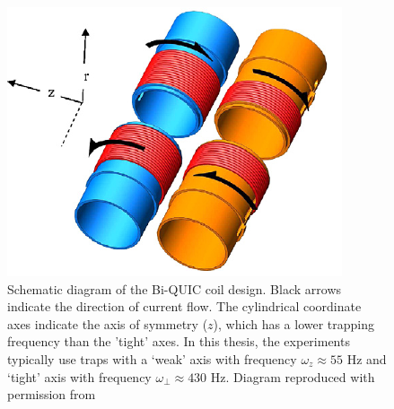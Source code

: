 	\begin{figure}
	\begin{minipage}{0.55\textwidth} %
	\vspace{0pt}
		\includegraphics[width=\textwidth]{fig/apparatus/biquic_coil.pdf}

	\end{minipage}
	\hfill
	\begin{minipage}{0.45\textwidth}
	\vspace{0pt}
	\caption{Schematic diagram of the Bi-QUIC coil design. Black arrows indicate the direction of current flow. The cylindrical coordinate axes indicate the axis of symmetry ($z$), which has a lower trapping frequency than the 'tight' axes. In this thesis, the experiments typically use traps with a `weak' axis with frequency $\omega_z\approx55$ Hz and `tight' axis with frequency $\omega_\perp\approx 430$ Hz. Diagram reproduced with permission from \cite{Dall07}}
	\end{minipage}
	\end{figure}

